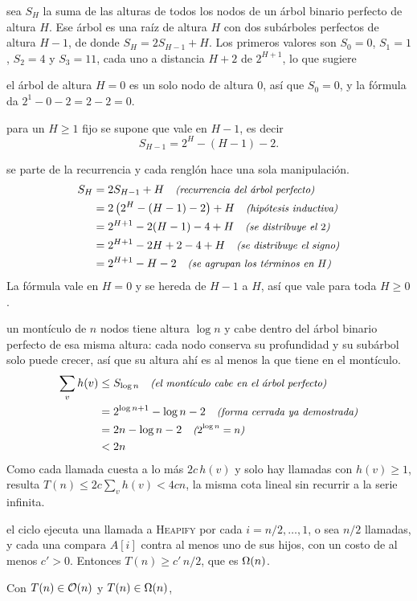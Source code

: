 \documentclass[11pt,letterpaper]{article}
\begin{document}
 sea $S_H$ la suma de las
alturas de todos los nodos de un árbol binario perfecto de altura $H$.
Ese árbol es una raíz de altura $H$ con dos subárboles perfectos de
altura $H-1$, de donde $S_H = 2S_{H-1} + H$. Los primeros valores son
$S_0 = 0$, $S_1 = 1$, $S_2 = 4$ y $S_3 = 11$, cada uno a distancia
$H + 2$ de $2^{H+1}$, lo que sugiere

 el árbol de altura $H = 0$ es un solo nodo de altura
$0$, así que $S_0 = 0$, y la fórmula da $2^{1} - 0 - 2 = 2 - 2 = 0$.

 para un $H \ge 1$ fijo se supone que vale
en $H-1$, es decir
\[
  S_{H-1} = 2^{H} - (H-1) - 2.
\]

 se parte de la recurrencia y cada renglón hace
una sola manipulación.
\begin{align*}
  S_H &= 2S_{H-1} + H
       \quad\text{\small\itshape (recurrencia del árbol perfecto)} \\
      &= 2\left(2^{H} - (H-1) - 2\right) + H
       \quad\text{\small\itshape (hipótesis inductiva)} \\
      &= 2^{H+1} - 2(H-1) - 4 + H
       \quad\text{\small\itshape (se distribuye el $2$)} \\
      &= 2^{H+1} - 2H + 2 - 4 + H
       \quad\text{\small\itshape (se distribuye el signo)} \\
      &= 2^{H+1} - H - 2
       \quad\text{\small\itshape (se agrupan los términos en $H$)}
\end{align*}
La fórmula vale en $H = 0$ y se hereda de $H-1$ a $H$, así que vale
para toda $H \ge 0$.

 un montículo de $n$ nodos tiene
altura $\log n$ y cabe dentro del árbol binario perfecto de esa misma
altura: cada nodo conserva su profundidad y su subárbol solo puede
crecer, así que su altura ahí es al menos la que tiene en el
montículo.
\begin{align*}
  \sum_{v} h(v) &\le S_{\log n}
                 \quad\text{\small\itshape (el montículo cabe en el árbol perfecto)} \\
                &= 2^{\log n + 1} - \log n - 2
                 \quad\text{\small\itshape (forma cerrada ya demostrada)} \\
                &= 2n - \log n - 2
                 \quad\text{\small\itshape ($2^{\log n} = n$)} \\
                &< 2n
\end{align*}
Como cada llamada cuesta a lo más $2c\,h(v)$ y solo hay llamadas con
$h(v) \ge 1$, resulta $T(n) \le 2c \sum_{v} h(v) < 4cn$, la misma cota
lineal sin recurrir a la serie infinita.

 el ciclo ejecuta una llamada a \textsc{Heapify}
por cada $i = n/2, \dots, 1$, o sea $n/2$ llamadas, y cada una compara
$A[i]$ contra al menos uno de sus hijos, con un costo de al menos
$c' > 0$. Entonces $T(n) \ge c'\,n/2$, que es $\Omega\!\left(n\right)$.

Con $T(n) \in \mathcal{O}\!\left(n\right)$ y $T(n) \in \Omega\!\left(n\right)$,
\end{document}
